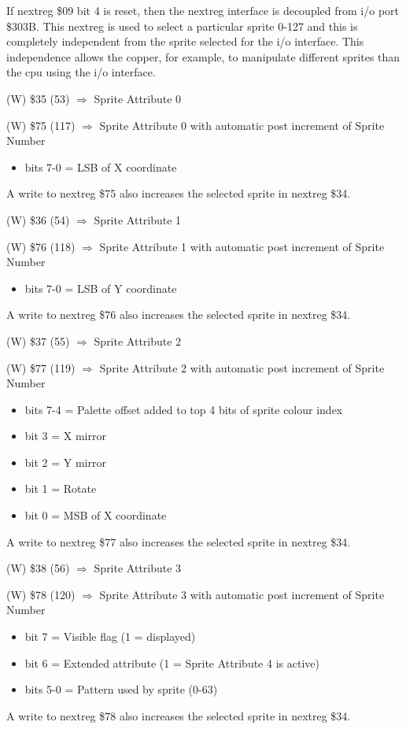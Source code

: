 If nextreg \$09 bit 4 is reset, then the nextreg interface is
decoupled from i/o port \$303B. This nextreg is used to select a
particular sprite 0-127 and this is completely independent from the
sprite selected for the i/o interface. This independence allows the
copper, for example, to manipulate different sprites than the cpu
using the i/o interface.

(W) \$35 (53) $\Rightarrow$ Sprite Attribute 0

(W) \$75 (117) $\Rightarrow$ Sprite Attribute 0 with automatic post
increment of Sprite Number
\begin{itemize}
\item[] bits 7-0 = LSB of X coordinate
\end{itemize}
A write to nextreg \$75 also increases the selected sprite in nextreg
\$34.

(W) \$36 (54) $\Rightarrow$ Sprite Attribute 1

(W) \$76 (118) $\Rightarrow$ Sprite Attribute 1 with automatic post
increment of Sprite Number
\begin{itemize}
\item[] bits 7-0 = LSB of Y coordinate
\end{itemize}
A write to nextreg \$76 also increases the selected sprite in nextreg
\$34.

(W) \$37 (55) $\Rightarrow$ Sprite Attribute 2

(W) \$77 (119) $\Rightarrow$ Sprite Attribute 2 with automatic post
increment of Sprite Number
\begin{itemize}
\item[] bits 7-4 = Palette offset added to top 4 bits of sprite colour
  index
\item[] bit 3 = X mirror
\item[] bit 2 = Y mirror
\item[] bit 1 = Rotate
\item[] bit 0 = MSB of X coordinate
\end{itemize}
A write to nextreg \$77 also increases the selected sprite in nextreg
\$34.

(W) \$38 (56) $\Rightarrow$ Sprite Attribute 3

(W) \$78 (120) $\Rightarrow$ Sprite Attribute 3 with automatic post
increment of Sprite Number
\begin{itemize}
\item[] bit 7 = Visible flag (1 = displayed)
\item[] bit 6 = Extended attribute (1 = Sprite Attribute 4 is active)
\item[] bits 5-0 = Pattern used by sprite (0-63)
\end{itemize}
A write to nextreg \$78 also increases the selected sprite in nextreg
\$34.

